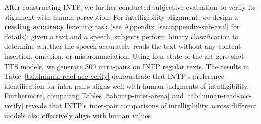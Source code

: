 \documentclass[11pt]{article}
\begin{document}
\begin{table}[t]
\begin{center}
\caption{Human-annotated reading accuracy ($\uparrow$) for four state-of-the-art zero-shot TTS models on regular texts. We use the intra-pair pipeline of INTP to generate the positive and negative samples.}
\label{tab:human-read-acc-verify}
\vspace{-5mm}
\end{center}
\end{table}

After constructing INTP, we further conducted subjective evaluation to verify its alignment with human perception. For intelligibility alignment, we design a \textbf{reading accuracy} listening task (see Appendix~\ref{sec:appendix-sub-eval} for details): given a text and a speech, subjects perform binary classification to determine whether the speech accurately reads the text without any content insertion, omission, or mispronunciation. Using four state-of-the-art zero-shot TTS models, we generate 300 intra-pairs on INTP regular texts. The results in Table~\ref{tab:human-read-acc-verify} demonstrate that INTP's preference identification for intra pairs aligns well with human judgments of intelligibility. Furthermore, comparing Tables~\ref{tab:intp-inter-arena} and \ref{tab:human-read-acc-verify} reveals that INTP's inter-pair comparisons of intelligibility across different models also effectively align with human values.
\end{document}
